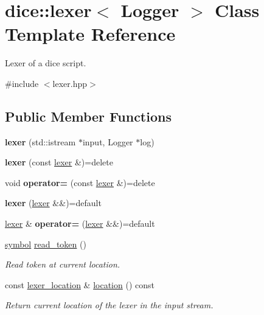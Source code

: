\hypertarget{classdice_1_1lexer}{}\section{dice\+:\+:lexer$<$ Logger $>$ Class Template Reference}
\label{classdice_1_1lexer}


Lexer of a dice script.  




{\ttfamily \#include $<$lexer.\+hpp$>$}

\subsection*{Public Member Functions}
\begin{DoxyCompactItemize}
\item 
\mbox{\label{classdice_1_1lexer_a3bc4744741a0ecbcb5f967d338a7ba00}} 
{\bfseries lexer} (std\+::istream $\ast$input, Logger $\ast$log)
\item 
\mbox{\label{classdice_1_1lexer_af1a50cceede3c51fdb3c007df9df4c7f}} 
{\bfseries lexer} (const \mbox{\hyperlink{classdice_1_1lexer}{lexer}} \&)=delete
\item 
\mbox{\label{classdice_1_1lexer_afb1a3f61435f8f0d25755f493b45c852}} 
void {\bfseries operator=} (const \mbox{\hyperlink{classdice_1_1lexer}{lexer}} \&)=delete
\item 
\mbox{\label{classdice_1_1lexer_abd6e792ad9d6ad88e991544b14842e39}} 
{\bfseries lexer} (\mbox{\hyperlink{classdice_1_1lexer}{lexer}} \&\&)=default
\item 
\mbox{\label{classdice_1_1lexer_a295deda298887957f8afb659a11ead00}} 
\mbox{\hyperlink{classdice_1_1lexer}{lexer}} \& {\bfseries operator=} (\mbox{\hyperlink{classdice_1_1lexer}{lexer}} \&\&)=default
\item 
\mbox{\hyperlink{structdice_1_1symbol}{symbol}} \mbox{\hyperlink{classdice_1_1lexer_a7dd396caa4bfcd3416569eb1be07ecdd}{read\+\_\+token}} ()
\begin{DoxyCompactList}\small\item\em Read token at current location. \end{DoxyCompactList}\item 
const \mbox{\hyperlink{structdice_1_1lexer__location}{lexer\+\_\+location}} \& \mbox{\hyperlink{classdice_1_1lexer_a1e62241846b4736d744fe9bb61385cc3}{location}} () const
\begin{DoxyCompactList}\small\item\em Return current location of the lexer in the input stream. \end{DoxyCompactList}\end{DoxyCompactItemize}



